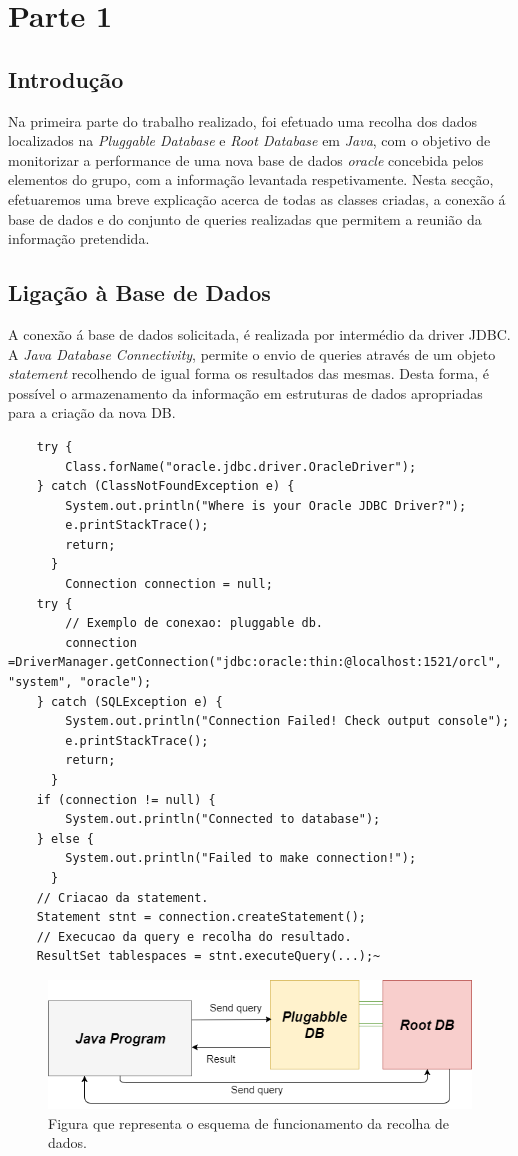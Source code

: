 \section*{Parte 1}\label{sec:parte1}
\subsection*{Introdução}
Na primeira parte do trabalho realizado, foi efetuado uma recolha dos dados localizados na \textit{Pluggable Database} e \textit{Root Database} em \textit{Java}, com o objetivo de monitorizar a performance de uma nova base de dados \textit{oracle} concebida pelos elementos do grupo, com a informação levantada respetivamente. Nesta secção, efetuaremos uma breve explicação acerca de todas as classes criadas, a conexão á base de dados e do conjunto de queries realizadas que permitem a reunião da informação pretendida.

\subsection*{Ligação à Base de Dados}
A conexão á base de dados solicitada, é realizada por intermédio da driver JDBC. A \textit{Java Database Connectivity}, permite o envio de queries através de um objeto \textit{statement} recolhendo de igual forma os resultados das mesmas. Desta forma, é possível o armazenamento da informação em estruturas de dados apropriadas para a criação da nova DB.
\begin{lstlisting}
    try {
        Class.forName("oracle.jdbc.driver.OracleDriver");
    } catch (ClassNotFoundException e) {
        System.out.println("Where is your Oracle JDBC Driver?");
        e.printStackTrace();
        return;
      }
        Connection connection = null;
    try {
        // Exemplo de conexao: pluggable db.
        connection =DriverManager.getConnection("jdbc:oracle:thin:@localhost:1521/orcl", "system", "oracle");
    } catch (SQLException e) {
        System.out.println("Connection Failed! Check output console");
        e.printStackTrace();
        return;
      }
    if (connection != null) {
        System.out.println("Connected to database");
    } else {
        System.out.println("Failed to make connection!");
      }
    // Criacao da statement.
    Statement stnt = connection.createStatement();
    // Execucao da query e recolha do resultado.
    ResultSet tablespaces = stnt.executeQuery(...);~

\end{lstlisting}
\vspace{5mm}
\begin{figure}[h!]
 \includegraphics[width=\linewidth]{tex/figs/esquema.png}
    \caption{Figura que representa o esquema de funcionamento da recolha de dados.} 
    \label{fig:esquema1}
\end{figure}
